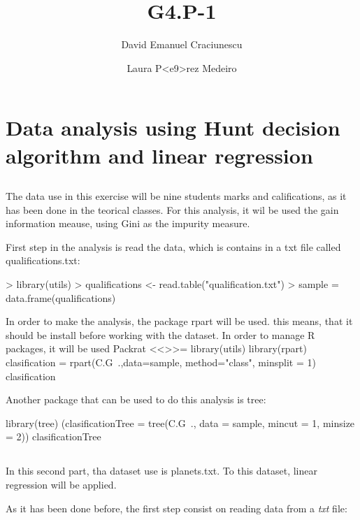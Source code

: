 \documentclass[a4paper]{article}
\title{G4.P-1}
\author{David Emanuel Craciunescu \and Laura P<e9>rez Medeiro}
\begin{document}


\maketitle


\section{Data analysis using Hunt decision algorithm and linear regression}

  \subsection{}The data use in this exercise will be nine students marks and califications, as it has been done in the teorical classes. For this analysis, it wil be used the gain information meause, using Gini as the impurity measure.
 
  First step in the analysis is read the data, which is contains in a txt file called qualifications.txt:
 
\begin{Schunk}
\begin{Sinput}
> library(utils)
> qualifications <- read.table("qualification.txt")
> sample = data.frame(qualifications)
\end{Sinput}
\end{Schunk}

In order to make the analysis, the package rpart will be used. this means, that it should be install before working with the dataset. In order to manage R packages, it will be used Packrat
 <<>>=
library(utils)
library(rpart)
clasification = rpart(C.G~.,data=sample, method="class", minsplit = 1)
clasification

Another package that can be used to do this analysis is tree:

library(tree)
(clasificationTree = tree(C.G~., data = sample, mincut = 1, minsize = 2))
clasificationTree


 
  \subsection{} In this second part, tha dataset use is planets.txt. To this dataset, linear regression will be applied.
  
As it has been done before, the first step consist on reading data from a \textit{txt} file:
 
\end{document}
